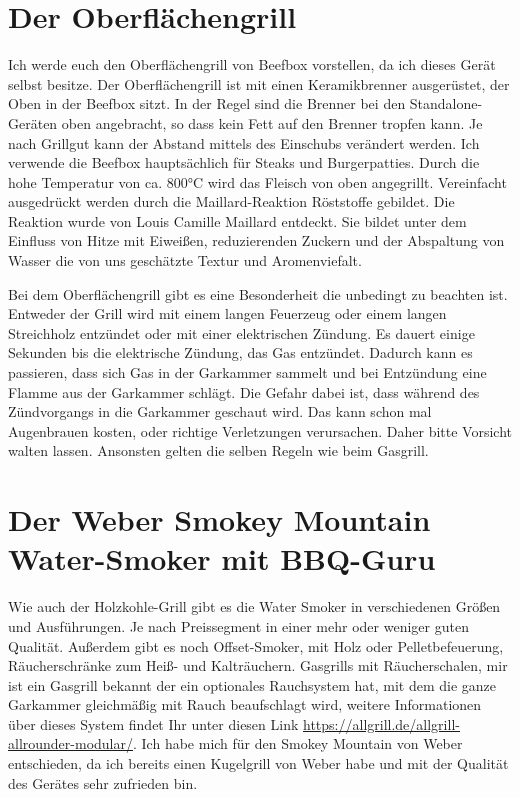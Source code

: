 \section{Der Oberflächengrill}
	
	Ich werde euch den Oberflächengrill von Beefbox vorstellen, da ich dieses 
	Gerät selbst besitze. Der Oberflächengrill ist mit 
	einen 
	Keramikbrenner ausgerüstet, der Oben in der Beefbox sitzt. In der Regel sind 
	die Brenner bei den Standalone-Geräten oben 
	angebracht, so dass kein Fett auf den Brenner tropfen kann. Je nach Grillgut 
	kann der Abstand mittels des Einschubs 
	verändert werden. Ich 
	verwende die Beefbox hauptsächlich für Steaks  und Burgerpatties. Durch die 
	hohe Temperatur von ca. 800°C wird das 
	Fleisch von oben angegrillt. Vereinfacht ausgedrückt werden durch die 
	Maillard-Reaktion Röststoffe gebildet. Die Reaktion 
	wurde von Louis Camille 
	Maillard entdeckt. Sie bildet unter dem Einfluss von Hitze mit Eiweißen, 
	reduzierenden Zuckern und der Abspaltung 
	von Wasser die von uns geschätzte Textur und Aromenviefalt. 
	
	Bei dem Oberflächengrill gibt es eine Besonderheit die unbedingt zu beachten 
	ist. Entweder der Grill wird mit einem langen 
	Feuerzeug oder einem
	langen Streichholz entzündet oder mit einer elektrischen Zündung. Es dauert 
	einige Sekunden bis die elektrische Zündung, 
	das Gas entzündet. Dadurch kann es 
	passieren, dass sich Gas in der Garkammer sammelt und bei Entzündung eine 
	Flamme aus der Garkammer schlägt. Die 
	Gefahr dabei ist, dass während des 
	Zündvorgangs in die Garkammer geschaut wird. Das kann schon mal 
	Augenbrauen kosten, oder richtige Verletzungen 
	verursachen. Daher bitte Vorsicht walten 
	lassen. Ansonsten gelten die selben Regeln wie beim Gasgrill.

\section{Der Weber Smokey Mountain Water-Smoker mit BBQ-Guru}

	Wie auch der Holzkohle-Grill gibt es die Water Smoker in verschiedenen 
	Größen und Ausführungen. Je nach Preissegment in 
	einer mehr oder weniger guten 
	Qualität.
	Außerdem gibt es noch Offset-Smoker, mit Holz oder Pelletbefeuerung, 
	Räucherschränke zum Heiß- und Kalträuchern. 
	Gasgrills mit Räucherschalen, mir ist
	ein Gasgrill bekannt der ein optionales Rauchsystem hat, mit dem die ganze 
	Garkammer gleichmäßig mit Rauch beaufschlagt 
	wird, weitere Informationen über 
	dieses System findet Ihr unter diesen Link 
	\url{https://allgrill.de/allgrill-allrounder-modular/}.
	Ich habe mich für den Smokey Mountain von Weber entschieden, da ich bereits 
	einen Kugelgrill von Weber habe und mit der 
	Qualität des Gerätes sehr zufrieden 
	bin.
	
